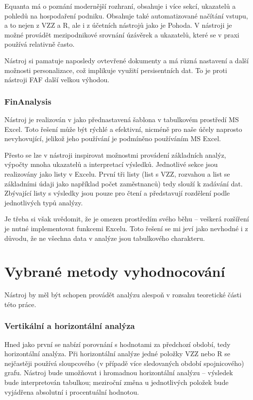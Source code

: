 Equanta má o poznání modernější rozhraní, obsahuje i více sekcí, ukazatelů a pohledů na hospodaření podniku. Obsahuje také automatizované načítání vstupu, a to nejen z VZZ a R, ale i z účetních nástrojů jako je Pohoda. V nástroji je možné provádět mezipodnikové srovnání úzávěrek a ukazatelů, které se v praxi používá relativně často.

Nástroj si pamatuje naposledy ovtevřené dokumenty a má různá nastavení a další možnosti personalizace, což implikuje využití persisentních dat. To je proti nástroji FAF další velkou výhodou. 


\subsubsection{FinAnalysis}
Nástroj je realizován v jako přednastavená šablona v tabulkovém prostředí MS Excel. Toto řešení může být rýchlé a efektivní, nicméně pro naše účely naprosto nevyhovující, jelikož jeho používání je podmíněno používáním MS Excel.

Přesto se lze v nástroji inspirovat možnostmi provádení základních analýz, výpočty mnoha ukazatelů a interpretací výsledků. Jednotlivé sekce jsou realizovány jako listy v Excelu. První tři listy (list s VZZ, rozvahou a list se základními údaji jako například počet zaměstnanců) tedy slouží k zadávání dat. Zbývající listy s výsledky jsou pouze pro čtení a představují rozdělení podle jednotlivých typů analýzy.  

Je třeba si však uvědomit, že je omezen prostředím svého běhu -- veškerá rozšíření je nutné implementovat funkcemi Excelu. Toto řešení se mi jeví jako nevhodné i z důvodu, že ne všechna data v analýze jsou tabulkového charakteru.



\section{Vybrané metody vyhodnocování}
Nástroj by měl být schopen provádět analýzu alespoň v rozsahu teoretické části této práce.


\subsubsection{Vertikální a horizontální analýza}
Hned jako první se nabízí porovnání s hodnotami za předchozí období, tedy horizontální analýza. Při horizontální analýze jedné položky VZZ nebo R se nejčastěji používá sloupcového (v případě více sledovaných období spojnicového) grafu. Nástroj bude umožňovat i hromadnou horizontální analýzu -- výsledek bude interpretován tabulkou; meziroční změna u jednotlivých položek bude vyjádřena absolutní i procentuální hodnotou. 

